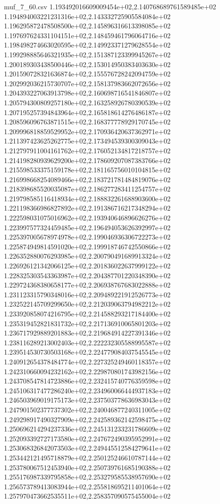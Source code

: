 \begin{filecontents*}{muf_7_60.csv}
1.193492016609009454e+02,2.140768689761589485e+02
1.194894003221231316e+02,2.143332725905584084e+02
1.196295872478508500e+02,2.145896316613398085e+02
1.197697624331104151e+02,2.148459461796064716e+02
1.198498274663020595e+02,2.149923371279628554e+02
1.199298885646321935e+02,2.151387123399945267e+02
1.200189303438500446e+02,2.153014950383403630e+02
1.201590728321636874e+02,2.155576728242094759e+02
1.202992036215730707e+02,2.158137983662072656e+02
1.204393227063913798e+02,2.160698716541846807e+02
1.205794300809257180e+02,2.163258926780390539e+02
1.207195257394843964e+02,2.165818614276486187e+02
1.208596096763871515e+02,2.168377778929170745e+02
1.209996818859529952e+02,2.170936420637362971e+02
1.211397423625262775e+02,2.173494539300309043e+02
1.212797911004161762e+02,2.176052134817218757e+02
1.214198280939629200e+02,2.178609207087383766e+02
1.215598533375159178e+02,2.181165756010104815e+02
1.216998668254089466e+02,2.183721781484819076e+02
1.218398685520035087e+02,2.186277283411254757e+02
1.219798585116418934e+02,2.188832261688903600e+02
1.221198366986827892e+02,2.191386716217348294e+02
1.222598031075016962e+02,2.193940646896626276e+02
1.223997577324459485e+02,2.196494053626392997e+02
1.225397005678974978e+02,2.199046936306722273e+02
1.225874949814591020e+02,2.199918746742550866e+02
1.226352880076293985e+02,2.200790491689913324e+02
1.226926121342066125e+02,2.201836022637999122e+02
1.228325303543363987e+02,2.204387701220348390e+02
1.229724368380658177e+02,2.206938767683022888e+02
1.231123315790348016e+02,2.209489221912526773e+02
1.232522145709299650e+02,2.212039063794982212e+02
1.233920858074216795e+02,2.214588293217184400e+02
1.235319452821831732e+02,2.217136910065801203e+02
1.236717929889201883e+02,2.219684914227391346e+02
1.238116289213002403e+02,2.222232305588995587e+02
1.239514530730503168e+02,2.224779084037545545e+02
1.240912654378484774e+02,2.227325249460118357e+02
1.242310660094232162e+02,2.229870801743982156e+02
1.243708547814723886e+02,2.232415740776359598e+02
1.245106317477286240e+02,2.234960066444937183e+02
1.246503969019175173e+02,2.237503778636983043e+02
1.247901502377737302e+02,2.240046877240311005e+02
1.249298917490327909e+02,2.242589362142598475e+02
1.250696214294237336e+02,2.245131233231786609e+02
1.252093392727173580e+02,2.247672490395952991e+02
1.253068326842073503e+02,2.249445512584279641e+02
1.253442121495718879e+02,2.250125246610787144e+02
1.253780067512453940e+02,2.250739761685190388e+02
1.255176987339795858e+02,2.253279585538957690e+02
1.256573789413083944e+02,2.255818695211401064e+02
1.257970473662535511e+02,2.258357090575455004e+02

\end{filecontents*}
